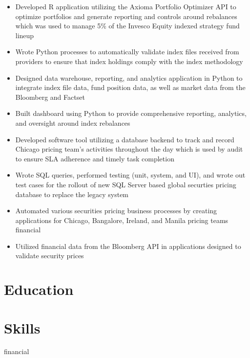 \documentclass[11pt,a4paper,sans]{moderncv}
\newcommand{\financial}{financial}
\begin{document}
	\begin{itemize}
		\item Developed R application utilizing the Axioma Portfolio Optimizer API to optimize portfolios and generate reporting and controls around rebalances which was 
			used to manage 5\% of the Invesco Equity indexed strategy fund lineup
		\item Wrote Python processes to automatically validate index files received from providers to ensure that index holdings comply with the index methodology
		\item Designed data warehouse, reporting, and analytics application in Python to integrate index file data, fund position data, as well as market data from the Bloomberg and Factset
		\item Built dashboard using Python to provide comprehensive reporting, analytics, and oversight around index rebalances
	\end{itemize}
	\vspace{5mm}
	\begin{itemize}
		\item Developed software tool utilizing a database backend to track and record Chicago pricing team's activities throughout the day which is used by audit to ensure SLA adherence and timely task completion
		\item Wrote SQL queries, performed testing (unit, system, and UI), and wrote out test cases for the rollout of new SQL Server based global securties pricing database to replace the legacy system
		\item Automated various securities pricing business processes by creating applications for Chicago, Bangalore, Ireland, and Manila pricing teams
		\ifx\resumeType\financial
			\item Utilized financial data from the Bloomberg API in applications designed to validate security prices
		\fi
	\end{itemize}

	\section{Education}

	\section{Skills}
	\ifx\resumeType\financial
	\fi
\end{document}

